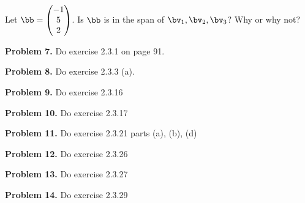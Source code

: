\documentclass[oneside,12pt]{amsart}
\begin{document}
Let $\bb=
\begin{pmatrix}
-1 \\
5 \\
2 \\
\end{pmatrix}
$.
Is $\bb$ is in the span of $\bv_1,\bv_2,\bv_3$? Why or why not?
\bigskip
\bigskip
\bigskip
\bigskip
\bigskip
\bigskip
\bigskip
\bigskip
\bigskip
\bigskip



\textbf{Problem 7.} Do exercise 2.3.1 on page 91.

\bigskip
\bigskip
\bigskip
\bigskip
\bigskip
\bigskip
\bigskip
\bigskip
\bigskip
\bigskip


\textbf{Problem 8.} Do exercise 2.3.3 (a).
\bigskip
\bigskip
\bigskip
\bigskip
\bigskip
\bigskip
\bigskip
\bigskip
\bigskip
\bigskip


\textbf{Problem 9.} Do exercise 2.3.16

\bigskip
\bigskip
\bigskip
\bigskip
\bigskip
\bigskip
\bigskip
\bigskip
\bigskip
\bigskip

\textbf{Problem 10.} Do exercise 2.3.17

\bigskip
\bigskip
\bigskip
\bigskip
\bigskip
\bigskip
\bigskip
\bigskip
\bigskip
\bigskip


\textbf{Problem 11.} Do exercise 2.3.21 parts (a), (b), (d)

\bigskip
\bigskip
\bigskip
\bigskip
\bigskip
\bigskip
\bigskip
\bigskip
\bigskip
\bigskip

\textbf{Problem 12.} Do exercise 2.3.26

\bigskip
\bigskip
\bigskip
\bigskip
\bigskip
\bigskip
\bigskip
\bigskip
\bigskip
\bigskip

\textbf{Problem 13.} Do exercise 2.3.27

\bigskip
\bigskip
\bigskip
\bigskip
\bigskip
\bigskip
\bigskip
\bigskip
\bigskip
\bigskip

\textbf{Problem 14.} Do exercise 2.3.29
\end{document}
